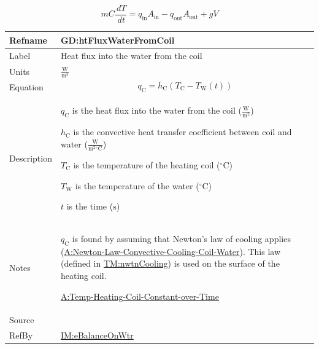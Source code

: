 \documentclass[12pt]{article}
\begin{document}
\begin{displaymath}
m C \frac{\,dT}{\,dt}={q_{\text{in}}} {A_{\text{in}}}-{q_{\text{out}}} {A_{\text{out}}}+g V
\end{displaymath}
\vspace{\baselineskip}
\noindent
\begin{minipage}{\textwidth}
\begin{tabular}{>{\raggedright}p{}>{\raggedright\arraybackslash}p{}}
\toprule \textbf{Refname} & \textbf{GD:htFluxWaterFromCoil}
\label{GD:htFluxWaterFromCoil}
\\ \midrule
Label & Heat flux into the water from the coil
        
\\ \midrule
Units & $\frac{\text{W}}{\text{m}^{2}}$
        
\\ \midrule
Equation & \begin{displaymath}
           {q_{\text{C}}}={h_{\text{C}}} \left({T_{\text{C}}}-{T_{\text{W}}}\left(t\right)\right)
           \end{displaymath}
\\ \midrule
Description & \begin{symbDescription}
              \item{${q_{\text{C}}}$ is the heat flux into the water from the coil ($\frac{\text{W}}{\text{m}^{2}}$)}
              \item{${h_{\text{C}}}$ is the convective heat transfer coefficient between coil and water ($\frac{\text{W}}{\text{m}^{2}{}^{\circ}\text{C}}$)}
              \item{${T_{\text{C}}}$ is the temperature of the heating coil (${{}^{\circ}\text{C}}$)}
              \item{${T_{\text{W}}}$ is the temperature of the water (${{}^{\circ}\text{C}}$)}
              \item{$t$ is the time (${\text{s}}$)}
              \end{symbDescription}
\\ \midrule
Notes & ${q_{\text{C}}}$ is found by assuming that Newton's law of cooling applies (\hyperref[assumpLCCCW]{A:Newton-Law-Convective-Cooling-Coil-Water}). This law (defined in \hyperref[TM:nwtnCooling]{TM:nwtnCooling}) is used on the surface of the heating coil.
        
        \hyperref[assumpTHCCoT]{A:Temp-Heating-Coil-Constant-over-Time}
        
\\ \midrule
Source & \cite{koothoor2013}
         
\\ \midrule
RefBy & \hyperref[IM:eBalanceOnWtr]{IM:eBalanceOnWtr}
        
\\ \bottomrule
\end{tabular}
\end{minipage}
\end{document}
